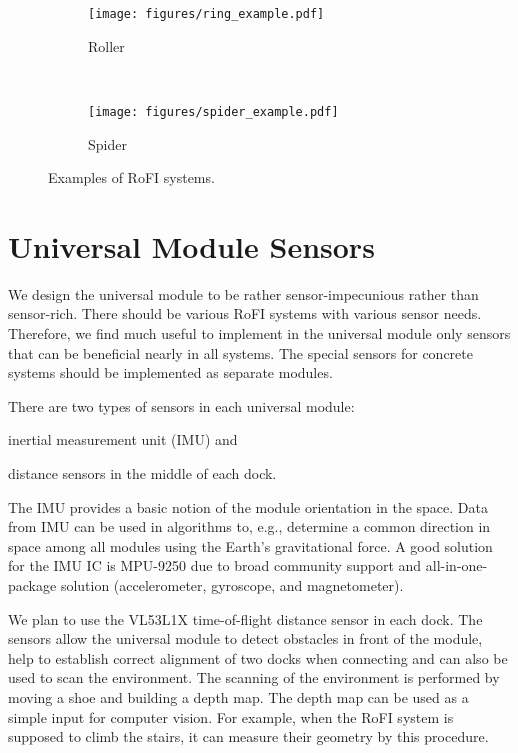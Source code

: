 \begin{figure}
    \centering
    \begin{subfigure}[b]{0.45\textwidth}
        \texttt{[image: figures/ring\_example.pdf]}
        \caption{Roller}
        \label{fig:example_roller}
    \end{subfigure}
    ~
    \begin{subfigure}[b]{0.45\textwidth}
        \texttt{[image: figures/spider\_example.pdf]}
        \caption{Spider}
        \label{fig:example_spider}
    \end{subfigure}

    \caption{Examples of RoFI systems.}
    \label{fig:examples}
\end{figure}

\section{Universal Module Sensors}

We design the universal module to be rather sensor-impecunious rather than
sensor-rich. There should be various RoFI systems with various sensor needs.
Therefore, we find much useful to implement in the universal module only sensors
that can be beneficial nearly in all systems. The special sensors for concrete
systems should be implemented as separate modules.

There are two types of sensors in each universal module:
\begin{enumerate*}
    \item inertial measurement unit (IMU) and
    \item distance sensors in the middle of each dock.
\end{enumerate*}
The IMU provides a basic notion of the module orientation in the space. Data
from IMU can be used in algorithms to, e.g., determine a common direction in
space among all modules using the Earth's gravitational force. A good solution
for the IMU IC is MPU-9250 \cite{noauthor_mpu-9250_2016} due to broad community
support and all-in-one-package solution (accelerometer, gyroscope, and
magnetometer).

We plan to use the VL53L1X \cite{noauthor_new_2018} time-of-flight distance
sensor in each dock. The sensors allow the universal module to detect obstacles
in front of the module, help to establish correct alignment of two docks when
connecting and can also be used to scan the environment. The scanning of the
environment is performed by moving a shoe and building a depth map. The depth
map can be used as a simple input for computer vision. For example, when the
RoFI system is supposed to climb the stairs, it can measure their geometry by
this procedure.

